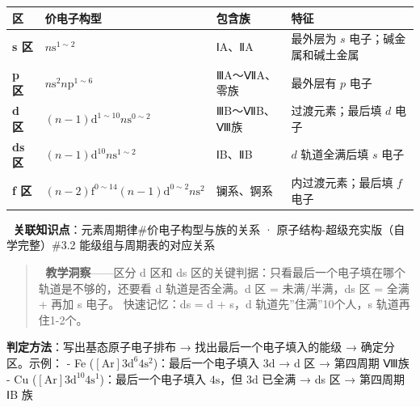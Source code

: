 \documentclass[a4paper,11pt]{ctexart}
\newcounter{none}
\begin{document}
{\def\LTcaptype{none} %
\begin{longtable}[]{@{}
  >{\centering\arraybackslash}p{}
  >{\raggedright\arraybackslash}p{}
  >{\raggedright\arraybackslash}p{}
  >{\raggedright\arraybackslash}p{}@{}}
\toprule\noalign{}
\begin{minipage}[b]{\linewidth}\centering
区
\end{minipage} & \begin{minipage}[b]{\linewidth}\raggedright
价电子构型
\end{minipage} & \begin{minipage}[b]{\linewidth}\raggedright
包含族
\end{minipage} & \begin{minipage}[b]{\linewidth}\raggedright
特征
\end{minipage} \\
\midrule\noalign{}
\endhead
\bottomrule\noalign{}
\endlastfoot
\textbf{s 区} & \(n\mathrm{s}^{1\sim2}\) & ⅠA、ⅡA & 最外层为 \(s\) 电子；碱金属和碱土金属 \\
\textbf{p 区} & \(n\mathrm{s}^{2}n\mathrm{p}^{1\sim6}\) & ⅢA～ⅦA、零族 & 最外层有 \(p\) 电子 \\
\textbf{d 区} & \((n-1)\mathrm{d}^{1\sim10}n\mathrm{s}^{0\sim2}\) & ⅢB～ⅦB、Ⅷ族 & 过渡元素；最后填 \(d\) 电子 \\
\textbf{ds 区} & \((n-1)\mathrm{d}^{10}n\mathrm{s}^{1\sim2}\) & ⅠB、ⅡB & \(d\) 轨道全满后填 \(s\) 电子 \\
\textbf{f 区} & \((n-2)\mathrm{f}^{0\sim14}(n-1)\mathrm{d}^{0\sim2}n\mathrm{s}^{2}\) & 镧系、锕系 & 内过渡元素；最后填 \(f\) 电子 \\
\end{longtable}
}

🔗 \textbf{关联知识点}：元素周期律\#价电子构型与族的关系 · 原子结构-超级充实版（自学完整）\#3.2 能级组与周期表的对应关系

\begin{quote}
🧠 \textbf{教学洞察}------区分 d 区和 ds 区的关键判据：只看最后一个电子填在哪个轨道是不够的，还要看 d 轨道是否全满。d 区 = 未满/半满，ds 区 = 全满 + 再加 s 电子。
快速记忆：ds = d + s，d 轨道先''住满''10个人，s 轨道再住1-2个。
\end{quote}

\textbf{判定方法}：写出基态原子电子排布 → 找出最后一个电子填入的能级 → 确定分区。示例：
- Fe (\([\mathrm{Ar}] 3\mathrm{d}^6 4\mathrm{s}^2\))：最后一个电子填入 \(3\mathrm{d}\) → d 区 → 第四周期 Ⅷ族
- Cu (\([\mathrm{Ar}] 3\mathrm{d}^{10} 4\mathrm{s}^1\))：最后一个电子填入 \(4\mathrm{s}\)，但 \(3\mathrm{d}\) 已全满 → ds 区 → 第四周期 ⅠB 族
\end{document}
